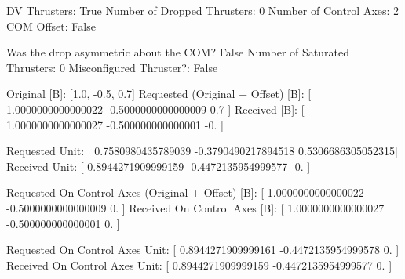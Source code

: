 DV Thrusters:	True
Number of Dropped Thrusters:	0
Number of Control Axes:	2
COM Offset:	False

Was the drop asymmetric about the COM?	False
Number of Saturated Thrusters:	0
Misconfigured Thruster?:	False

Original [B]:	[1.0, -0.5, 0.7]
Requested (Original + Offset) [B]:	[ 1.0000000000000022 -0.5000000000000009  0.7               ]
Received [B]:		[ 1.0000000000000027 -0.500000000000001  -0.                ]

Requested Unit:		[ 0.7580980435789039 -0.3790490217894518  0.5306686305052315]
Received Unit:		[ 0.8944271909999159 -0.4472135954999577 -0.                ]

Requested On Control Axes (Original + Offset) [B]:	[ 1.0000000000000022 -0.5000000000000009  0.                ]
Received On Control Axes [B]:		[ 1.0000000000000027 -0.500000000000001   0.                ]

Requested On Control Axes Unit:		[ 0.8944271909999161 -0.4472135954999578  0.                ]
Received On Control Axes Unit:		[ 0.8944271909999159 -0.4472135954999577  0.                ]

